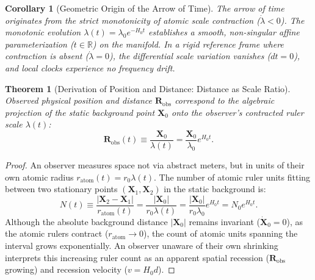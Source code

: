 \documentclass[11pt,a4paper]{article}
\newtheorem{theorem}{Theorem}[section]
\newtheorem{corollary}{Corollary}[theorem]
\begin{document}
\begin{corollary}[Geometric Origin of the Arrow of Time]
    \label{cor:zaman_oku_sc}
    The arrow of time originates from the strict monotonicity of atomic scale contraction ($\dot{\lambda} < 0$). The monotonic evolution $\lambda(t) = \lambda_0 e^{-H_0 t}$ establishes a smooth, non-singular affine parameterization ($t \in \mathbb{R}$) on the manifold. In a rigid reference frame where contraction is absent ($\dot{\lambda} = 0$), the differential scale variation vanishes ($dt = 0$), and local clocks experience no frequency drift.
\end{corollary}

\begin{theorem}[Derivation of Position and Distance: Distance as Scale Ratio]
    \label{thm:konum_turetilis}
    Observed physical position and distance $\mathbf{R}_{\mathrm{obs}}$ correspond to the algebraic projection of the static background point $\mathbf{X}_0$ onto the observer's contracted ruler scale $\lambda(t)$:
    \begin{equation}
        \mathbf{R}_{\mathrm{obs}}(t) \equiv \frac{\mathbf{X}_0}{\lambda(t)} = \frac{\mathbf{X}_0}{\lambda_0} e^{H_0 t}.
        \label{eq:konum_turetilis}
    \end{equation}
\end{theorem}

\begin{proof}
    An observer measures space not via abstract meters, but in units of their own atomic radius $r_{\mathrm{atom}}(t) = r_0 \lambda(t)$. The number of atomic ruler units fitting between two stationary points $(\mathbf{X}_1, \mathbf{X}_2)$ in the static background is:
    \begin{equation}
        N(t) \equiv \frac{|\mathbf{X}_2 - \mathbf{X}_1|}{r_{\mathrm{atom}}(t)} = \frac{|\mathbf{X}_0|}{r_0 \lambda(t)} = \frac{|\mathbf{X}_0|}{r_0 \lambda_0} e^{H_0 t} = N_0 e^{H_0 t}.
        \label{eq:cetvel_sayimi_ispat_sc}
    \end{equation}
    Although the absolute background distance $|\mathbf{X}_0|$ remains invariant ($\dot{\mathbf{X}}_0 = 0$), as the atomic rulers contract ($r_{\mathrm{atom}} \to 0$), the count of atomic units spanning the interval grows exponentially. An observer unaware of their own shrinking interprets this increasing ruler count as an apparent spatial recession ($\mathbf{R}_{\mathrm{obs}}$ growing) and recession velocity ($v = H_0 d$).
\end{proof}
\end{document}
